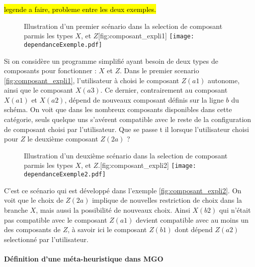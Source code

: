 \hl{legende a faire, probleme entre les deux exemples.}

\begin{figure}[!htbp]
	\begin{sidecaption}[fortoc]{Illustration d'un premier scénario dans la selection de composant parmis les types $X$, et $Z$}[fig:composant_expli1]
		\centering
		\texttt{[image: dependanceExemple.pdf]}{
		}
  \end{sidecaption}
\end{figure}

Si on considère un programme simplifié ayant besoin de deux types de composants pour fonctionner : $X$ et $Z$. Dans le premier scenario \ref{fig:composant_expli1}, l'utilisateur à choisi le composant $Z(a1)$ autonome, ainsi que le composant $X(a3)$. Ce dernier, contrairement au composant $X(a1)$ et $X(a2)$, dépend de nouveaux composant définis sur la ligne $b$ du schéma. On voit que dans les nombreux composants disponibles dans cette catégorie, seuls quelque uns s'avérent compatible avec le reste de la configuration de composant choisi par l'utilisateur. Que se passe t il lorsque l'utilisateur choisi pour $Z$ le deuxième composant $Z(2a)$ ? 

\begin{figure}[!htbp]
	\begin{sidecaption}[fortoc]{Illustration d'un deuxième scénario dans la selection de composant parmis les types $X$, et $Z$.}[fig:composant_expli2]
		\centering
		\texttt{[image: dependanceExemple2.pdf]}{
		}
  \end{sidecaption}
\end{figure}

C'est ce scénario qui est développé dans l'exemple \ref{fig:composant_expli2}. On voit que le choix de $Z(2a)$ implique de nouvelles restriction de choix dans la branche $X$, mais aussi la possibilité de nouveaux choix. Ainsi $X(b2)$ qui n'était pas compatible avec le composant $Z(a1)$ devient compatible avec au moins un des composants de $Z$, à savoir ici le composant $Z(b1)$ dont dépend $Z(a2)$ selectionné par l'utilisateur.


\paragraph{Définition d'une méta-heuristique dans MGO}

